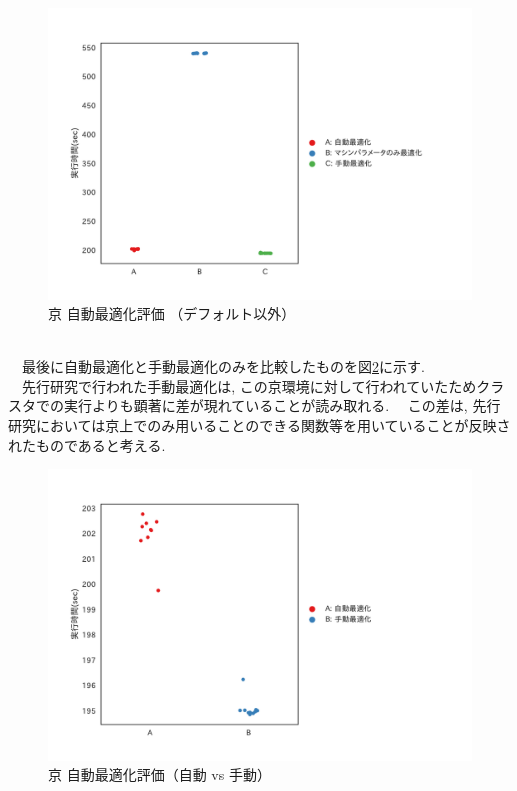 \begin{figure}[htb]
 \begin{center}
    \includegraphics[width=14cm]{./images/k-compare-2.pdf}
    \caption{京 自動最適化評価 （デフォルト以外）}
    \label{fig:k-compare-2}
  \end{center}
\end{figure}~\\
  \clearpage
　最後に自動最適化と手動最適化のみを比較したものを図\ref{fig:k-compare-3}に示す.\\
　先行研究\cite{miyamoto-master}で行われた手動最適化は, この京環境に対して行われていたためクラスタでの実行よりも顕著に差が現れていることが読み取れる.　
この差は, 先行研究\cite{miyamoto-master}においては京上でのみ用いることのできる関数等を用いていることが反映されたものであると考える.\\
\begin{figure}[htb]
 \begin{center}
    \includegraphics[width=14cm]{./images/k-compare-3.pdf}
    \caption{京 自動最適化評価（自動 vs 手動）}
    \label{fig:k-compare-3}
  \end{center}
\end{figure}~\\
\clearpage
